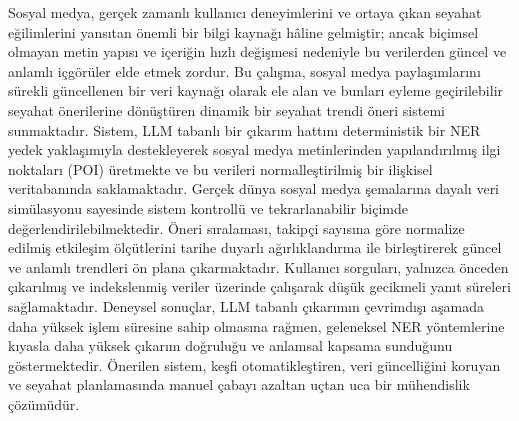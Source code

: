 \documentclass[a4paper,12pt]{report}
\begin{document}
\begin{ozet}
Sosyal medya, gerçek zamanlı kullanıcı deneyimlerini ve ortaya çıkan seyahat eğilimlerini yansıtan önemli bir bilgi kaynağı hâline gelmiştir; ancak biçimsel olmayan metin yapısı ve içeriğin hızlı değişmesi nedeniyle bu verilerden güncel ve anlamlı içgörüler elde etmek zordur. Bu çalışma, sosyal medya paylaşımlarını sürekli güncellenen bir veri kaynağı olarak ele alan ve bunları eyleme geçirilebilir seyahat önerilerine dönüştüren dinamik bir seyahat trendi öneri sistemi sunmaktadır. Sistem, LLM tabanlı bir çıkarım hattını deterministik bir NER yedek yaklaşımıyla destekleyerek sosyal medya metinlerinden yapılandırılmış ilgi noktaları (POI) üretmekte ve bu verileri normalleştirilmiş bir ilişkisel veritabanında saklamaktadır. Gerçek dünya sosyal medya şemalarına dayalı veri simülasyonu sayesinde sistem kontrollü ve tekrarlanabilir biçimde değerlendirilebilmektedir. Öneri sıralaması, takipçi sayısına göre normalize edilmiş etkileşim ölçütlerini tarihe duyarlı ağırlıklandırma ile birleştirerek güncel ve anlamlı trendleri ön plana çıkarmaktadır. Kullanıcı sorguları, yalnızca önceden çıkarılmış ve indekslenmiş veriler üzerinde çalışarak düşük gecikmeli yanıt süreleri sağlamaktadır. Deneysel sonuçlar, LLM tabanlı çıkarımın çevrimdışı aşamada daha yüksek işlem süresine sahip olmasına rağmen, geleneksel NER yöntemlerine kıyasla daha yüksek çıkarım doğruluğu ve anlamsal kapsama sunduğunu göstermektedir. Önerilen sistem, keşfi otomatikleştiren, veri güncelliğini koruyan ve seyahat planlamasında manuel çabayı azaltan uçtan uca bir mühendislik çözümüdür.
\end{ozet}

\tableofcontents

\listoffigures

\listoftables

\begin{symbols-abbreviations}
\end{symbols-abbreviations}
\end{document}
